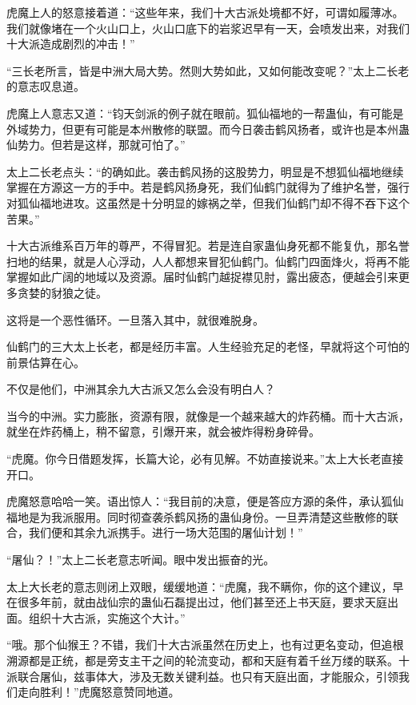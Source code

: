 
\begin{this_body}

虎魔上人的怒意接着道：“这些年来，我们十大古派处境都不好，可谓如履薄冰。我们就像堵在一个火山口上，火山口底下的岩浆迟早有一天，会喷发出来，对我们十大派造成剧烈的冲击！”

“三长老所言，皆是中洲大局大势。然则大势如此，又如何能改变呢？”太上二长老的意志叹息道。

虎魔上人意志又道：“钧天剑派的例子就在眼前。狐仙福地的一帮蛊仙，有可能是外域势力，但更有可能是本州散修的联盟。而今日袭击鹤风扬者，或许也是本州蛊仙势力。但若是这样，那就可怕了。”

太上二长老点头：“的确如此。袭击鹤风扬的这股势力，明显是不想狐仙福地继续掌握在方源这一方的手中。若是鹤风扬身死，我们仙鹤门就得为了维护名誉，强行对狐仙福地进攻。这虽然是十分明显的嫁祸之举，但我们仙鹤门却不得不吞下这个苦果。”

十大古派维系百万年的尊严，不得冒犯。若是连自家蛊仙身死都不能复仇，那名誉扫地的结果，就是人心浮动，人人都想来冒犯仙鹤门。仙鹤门四面烽火，将再不能掌握如此广阔的地域以及资源。届时仙鹤门越捉襟见肘，露出疲态，便越会引来更多贪婪的豺狼之徒。

这将是一个恶性循环。一旦落入其中，就很难脱身。

仙鹤门的三大太上长老，都是经历丰富。人生经验充足的老怪，早就将这个可怕的前景估算在心。

不仅是他们，中洲其余九大古派又怎么会没有明白人？

当今的中洲。实力膨胀，资源有限，就像是一个越来越大的炸药桶。而十大古派，就坐在炸药桶上，稍不留意，引爆开来，就会被炸得粉身碎骨。

“虎魔。你今日借题发挥，长篇大论，必有见解。不妨直接说来。”太上大长老直接开口。

虎魔怒意哈哈一笑。语出惊人：“我目前的决意，便是答应方源的条件，承认狐仙福地是为我派服用。同时彻查袭杀鹤风扬的蛊仙身份。一旦弄清楚这些散修的联合，我们便和其余九派携手。进行一场大范围的屠仙计划！”

“屠仙？！”太上二长老意志听闻。眼中发出振奋的光。

太上大长老的意志则闭上双眼，缓缓地道：“虎魔，我不瞒你，你的这个建议，早在很多年前，就由战仙宗的蛊仙石磊提出过，他们甚至还上书天庭，要求天庭出面。组织十大古派，实施这个大计。”

“哦。那个仙猴王？不错，我们十大古派虽然在历史上，也有过更名变动，但追根溯源都是正统，都是旁支主干之间的轮流变动，都和天庭有着千丝万缕的联系。十派联合屠仙，兹事体大，涉及无数关键利益。也只有天庭出面，才能服众，引领我们走向胜利！”虎魔怒意赞同地道。


\end{this_body}
